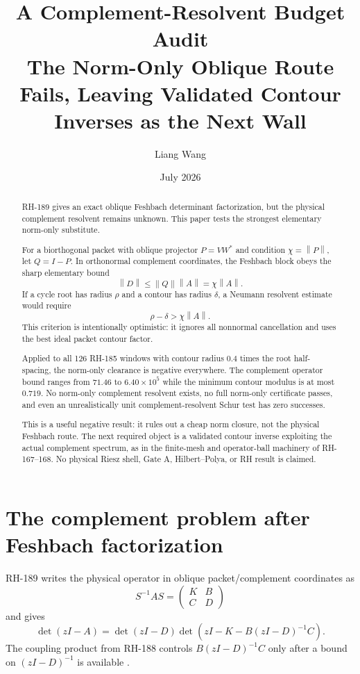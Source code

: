 \documentclass[12pt]{article}
\title{A Complement-Resolvent Budget Audit\\
\large The Norm-Only Oblique Route Fails, Leaving Validated Contour Inverses as the Next Wall}
\author{Liang Wang}
\date{July 2026}
\theoremstyle{remark}
\newcommand{\norm}[1]{\left\lVert#1\right\rVert}
\begin{document}
\maketitle

\begin{abstract}
RH-189 gives an exact oblique Feshbach determinant factorization, but the
physical complement resolvent remains unknown.  This paper tests the
strongest elementary norm-only substitute.

For a biorthogonal packet with oblique projector $P=VW^*$ and condition
$\chi=\norm P$, let $Q=I-P$.  In orthonormal complement coordinates, the
Feshbach block obeys the sharp elementary bound
\[
 \norm D\le\norm Q\norm A=\chi\norm A.
\]
If a cycle root has radius $\rho$ and a contour has radius $\delta$, a
Neumann resolvent estimate would require
\[
 \rho-\delta>\chi\norm A.
\]
This criterion is intentionally optimistic: it ignores all nonnormal
cancellation and uses the best ideal packet contour factor.

Applied to all 126 RH-185 windows with contour radius $0.4$ times the root
half-spacing, the norm-only clearance is negative everywhere.  The complement
operator bound ranges from $71.46$ to $6.40\times10^5$ while the
minimum contour modulus is at most $0.719$.  No norm-only complement
resolvent exists, no full norm-only certificate passes, and even an
unrealistically unit complement-resolvent Schur test has zero successes.

This is a useful negative result: it rules out a cheap norm closure, not the
physical Feshbach route.  The next required object is a validated contour
inverse exploiting the actual complement spectrum, as in the finite-mesh and
operator-ball machinery of RH-167--168.  No physical Riesz shell, Gate A,
Hilbert--Polya, or RH result is claimed.
\end{abstract}

\section{The complement problem after Feshbach factorization}

RH-189 writes the physical operator in oblique packet/complement coordinates
as
\begin{equation}\label{eq:block}
 S^{-1}AS=\begin{pmatrix}K&B\\C&D\end{pmatrix}
\end{equation}
and gives
\begin{equation}\label{eq:feshbach}
 \det(zI-A)=\det(zI-D)
 \det\left(zI-K-B(zI-D)^{-1}C\right).
\end{equation}
The coupling product from RH-188 controls $B(zI-D)^{-1}C$ only after a bound
on $(zI-D)^{-1}$ is available \citep{WangRH188,WangRH189}.
\end{document}
